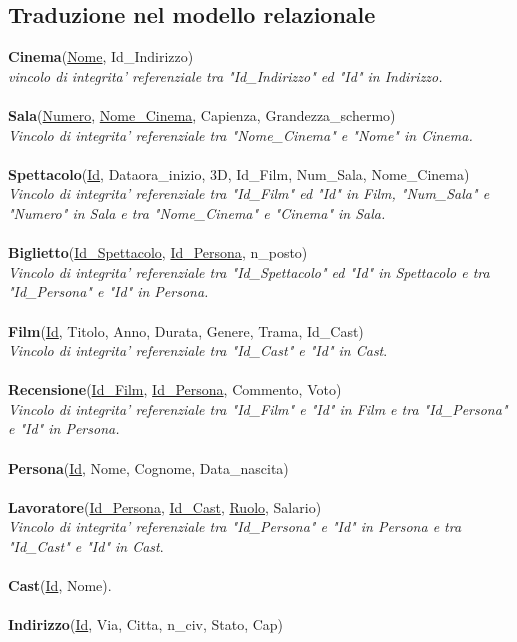 \documentclass[10pt]{article}
\begin{document}
	\subsection{Traduzione nel modello relazionale}
	\textbf{Cinema}(\underline{Nome}, Id\_Indirizzo)\\
	\textit{vincolo di integrita' referenziale tra "Id\_Indirizzo" ed "Id" in Indirizzo.}\\\\
	\textbf{Sala}(\underline{Numero}, \underline{Nome\_Cinema}, Capienza, Grandezza\_schermo)\\
	\textit{Vincolo di integrita' referenziale tra "Nome\_Cinema" e "Nome" in Cinema.}\\\\
	\textbf{Spettacolo}(\underline{Id}, Dataora\_inizio, 3D, Id\_Film, Num\_Sala, Nome\_Cinema)\\
	\textit{Vincolo di integrita' referenziale tra "Id\_Film" ed "Id" in Film, "Num\_Sala" e "Numero" in Sala e tra "Nome\_Cinema" e "Cinema" in Sala.}\\\\
	\textbf{Biglietto}(\underline{Id\_Spettacolo}, \underline{Id\_Persona}, n\_posto)\\
	\textit{Vincolo di integrita' referenziale tra "Id\_Spettacolo" ed "Id" in Spettacolo e tra "Id\_Persona" e "Id" in Persona.}\\\\
	\textbf{Film}(\underline{Id}, Titolo, Anno, Durata, Genere, Trama, Id\_Cast)\\
	\textit{Vincolo di integrita' referenziale tra "Id\_Cast" e "Id" in Cast}.\\\\
	\textbf{Recensione}(\underline{Id\_Film}, \underline{Id\_Persona}, Commento, Voto)\\
	\textit{Vincolo di integrita' referenziale tra "Id\_Film" e "Id" in Film e tra "Id\_Persona" e "Id" in Persona.}\\\\
	\textbf{Persona}(\underline{Id}, Nome, Cognome, Data\_nascita)\\\\
	\textbf{Lavoratore}(\underline{Id\_Persona}, \underline{Id\_Cast}, \underline{Ruolo}, Salario)\\	
	\textit{Vincolo di integrita' referenziale tra "Id\_Persona" e "Id" in Persona e tra "Id\_Cast" e "Id" in Cast}.\\\\
	\textbf{Cast}(\underline{Id}, Nome).\\\\
	\textbf{Indirizzo}(\underline{Id}, Via, Citta, n\_civ, Stato, Cap)\\\\
\end{document}
